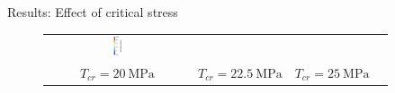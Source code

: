 \documentclass[10pt,xcolor=dvipsnames,compress]{beamer}
\begin{document}
\begin{frame}{Results: Effect of critical stress}
\begin{figure}
\begin{tabular}{c c c c}
        \includegraphics[width=0.06\textwidth]{Figures/CS_contour.png}
        \\
        $T_{cr} = 20 \: \text{MPa}$ &  $T_{cr} = 22.5 \: \text{MPa}$ & $T_{cr} = 25 \: \text{MPa}$ &\\
       \end{tabular}
        \label{fig:1}
    \end{figure}
\end{frame}
\end{document}
